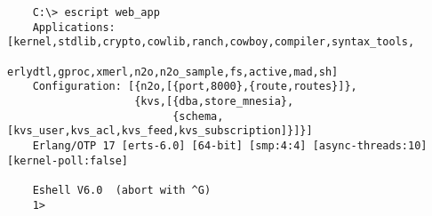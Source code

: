 \vspace{1\baselineskip}
\begin{lstlisting}
    C:\> escript web_app
    Applications: [kernel,stdlib,crypto,cowlib,ranch,cowboy,compiler,syntax_tools,
                   erlydtl,gproc,xmerl,n2o,n2o_sample,fs,active,mad,sh]
    Configuration: [{n2o,[{port,8000},{route,routes}]},
                    {kvs,[{dba,store_mnesia},
                          {schema,[kvs_user,kvs_acl,kvs_feed,kvs_subscription]}]}]
    Erlang/OTP 17 [erts-6.0] [64-bit] [smp:4:4] [async-threads:10] [kernel-poll:false]

    Eshell V6.0  (abort with ^G)
    1>
\end{lstlisting}
\vspace{1\baselineskip}

